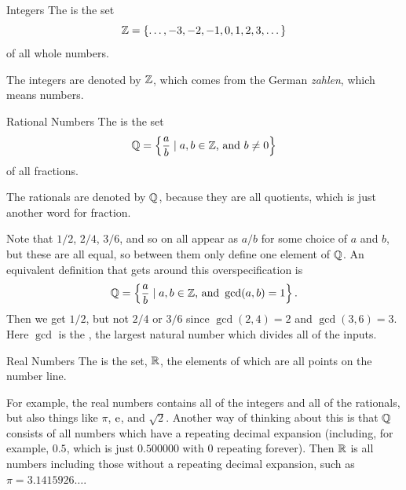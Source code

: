 \documentclass[fleqn]{LectureClass/LectureClass}
\begin{document}
    \begin{dfn}{Integers}{}
        The  is the set
        \begin{equation}
            \mathbb{Z} = \{\dotsc, -3, -2, -1, 0, 1, 2, 3, \dotsc\}
        \end{equation}
        of all whole numbers.
    \end{dfn}
    
    \begin{remark}{}{}
        The integers are denoted by \(\mathbb{Z}\), which comes from the German \textit{zahlen}, which means numbers.
    \end{remark}
    
    \begin{dfn}{Rational Numbers}{}
        The  is the set
        \begin{equation}
            \mathbb{Q} = \left\{ \frac{a}{b} \mid a, b \in \mathbb{Z} \text{, and } b \ne 0 \right\}
        \end{equation}
        of all fractions.
    \end{dfn}
    
    \begin{remark}{}{}
        The rationals are denoted by \(\mathbb{Q}\), because they are all quotients, which is just another word for fraction.
    \end{remark}
    
    Note that \(1/2\), \(2/4\), \(3/6\), and so on all appear as \(a/b\) for some choice of \(a\) and \(b\), but these are all equal, so between them only define one element of \(\mathbb{Q}\).
    An equivalent definition that gets around this overspecification is
    \begin{equation}
        \mathbb{Q} = \left\{ \frac{a}{b} \mid a, b \in \mathbb{Z} \text{, and } \gcd(a, b) = 1 \right\}.
    \end{equation}
    Then we get \(1/2\), but not \(2/4\) or \(3/6\) since \(\gcd(2, 4) = 2\) and \(\gcd(3, 6) = 3\).
    Here \(\gcd\) is the , the largest natural number which divides all of the inputs.
    
    \begin{dfn}{Real Numbers}{}
        The  is the set, \(\mathbb{R}\), the elements of which are all points on the number line.
    \end{dfn}
    
    For example, the real numbers contains all of the integers and all of the rationals, but also things like \(\pi\), \(\mathrm{e}\), and \(\sqrt{2}\).
    Another way of thinking about this is that \(\mathbb{Q}\) consists of all numbers which have a repeating decimal expansion (including, for example, \(0.5\), which is just \(0.500000\) with \(0\) repeating forever).
    Then \(\mathbb{R}\) is all numbers including those without a repeating decimal expansion, such as \(\pi = 3.1415926\ldots\).
    
\end{document}
